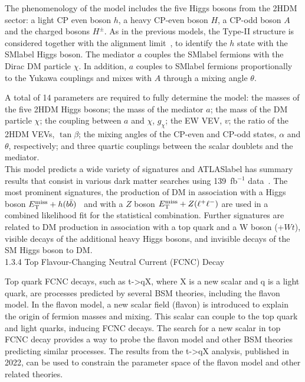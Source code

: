 The phenomenology of the model includes the five Higgs bosons from the 2HDM sector: a light CP even boson $h$, a heavy CP-even boson $H$, a CP-odd boson $A$ and the charged bosons $H^\pm$. As in the previous models, the Type-II structure is considered together with the alignment limit~\cite{Gunion_2003}, to identify the $h$ state with the \acrshort{SMlabel} Higgs boson. The mediator $a$ couples the \acrshort{SMlabel} fermions with the Dirac DM particle $\chi$. In addition, $a$ couples to \acrshort{SMlabel} fermions proportionally to the Yukawa couplings and mixes with $A$ through a mixing angle $\theta$.

A total of 14 parameters are required to fully determine the model: the masses of the five 2HDM Higgs bosons; the mass of the mediator $a$; the mass of the DM particle $\chi$; the coupling between $a$ and $\chi$, $g_\chi$; the \acrshort{EW} \acrshort{VEV}, $v$; the ratio of the 2HDM \acrshort{VEV}s, $\tan\beta$; the mixing angles of the CP-even and CP-odd states, $\alpha$ and $\theta$, respectively; and three quartic couplings between the scalar doublets and the mediator.\\

This model predicts a wide variety of signatures and \acrshort{ATLASlabel} has summary results that consist in various dark matter searches using 139~fb$^{-1}$ data~\cite{Hpluscomb}. The most prominent signatures, the production of DM in association with a Higgs boson $E_{\text{T}}^{\text{miss}}+h(b\bar{b})$~\cite{2108.13391} and with a $Z$ boson $E_{\text{T}}^{\text{miss}}+Z(\ell^+\ell^-)$ are used in a combined likelihood fit for the statistical combination. Further signatures are related to DM production in association with a top quark and a W boson (\MET+$Wt$), visible decays of the additional heavy Higgs bosons, and invisible decays of the SM Higgs boson to DM.\\

1.3.4 Top Flavour-Changing Neutral Current (FCNC) Decay

Top quark FCNC decays, such as t->qX, where X is a new scalar and q is a light quark, are processes predicted by several BSM theories, including the flavon model. In the flavon model, a new scalar field (flavon) is introduced to explain the origin of fermion masses and mixing. This scalar can couple to the top quark and light quarks, inducing FCNC decays. The search for a new scalar in top FCNC decay provides a way to probe the flavon model and other BSM theories predicting similar processes. The results from the t->qX analysis, published in 2022, can be used to constrain the parameter space of the flavon model and other related theories.








